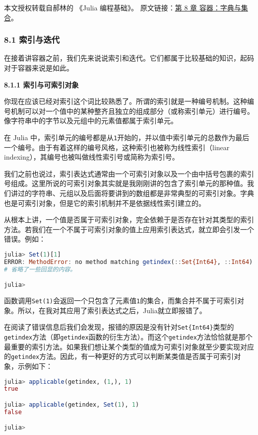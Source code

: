 
本文授权转载自郝林的 《Julia 编程基础》。 原文链接：\href{https://github.com/hyper0x/JuliaBasics/blob/master/book/ch08.md}{第 8 章 容器：字典与集合}。


\subsubsection{8.1 索引与迭代}

在接着讲容器之前，我们先来说说索引和迭代。它们都属于比较基础的知识，起码对于容器来说是如此。

\textbf{8.1.1 索引与可索引对象}

你现在应该已经对索引这个词比较熟悉了。所谓的索引就是一种编号机制。这种编号机制可以对一个值中的某种整齐且独立的组成部分（或称索引单元）进行编号。像字符串中的字节以及元组中的元素值都属于索引单元。

在 Julia 中，索引单元的编号都是从\verb`1`开始的，并以值中索引单元的总数作为最后一个编号。由于有着这样的编号风格，这种索引也被称为线性索引（linear indexing），其编号也被叫做线性索引号或简称为索引号。

我们之前也说过，索引表达式通常由一个可索引对象以及一个由中括号包裹的索引号组成。这里所说的可索引对象其实就是我刚刚讲的包含了索引单元的那种值。我们讲过的字符串、元组以及后面将要讲到的数组都是非常典型的可索引对象。字典也是可索引对象，但是它的索引机制并不是依据线性索引建立的。

从根本上讲，一个值是否属于可索引对象，完全依赖于是否存在针对其类型的索引方法。若我们在一个不属于可索引对象的值上应用索引表达式，就立即会引发一个错误。例如：
\begin{lstlisting}[language=julia]
julia> Set(1)[1]
ERROR: MethodError: no method matching getindex(::Set{Int64}, ::Int64)
# 省略了一些回显的内容。

julia> 
\end{lstlisting}

函数调用\verb`Set(1)`会返回一个只包含了元素值\verb`1`的集合，而集合并不属于可索引对象。所以，在我对其应用了索引表达式之后，Julia就立即报错了。

在阅读了错误信息后我们会发现，报错的原因是没有针对\verb`Set{Int64}`类型的\verb`getindex`方法（即\verb`getindex`函数的衍生方法）。而这个\verb`getindex`方法恰恰就是那个最重要的索引方法。如果我们想让某个类型的值成为可索引对象就至少要实现对应的\verb`getindex`方法。因此，有一种更好的方式可以判断某类值是否属于可索引对象，示例如下：
\begin{lstlisting}[language=julia]
julia> applicable(getindex, (1,), 1)
true

julia> applicable(getindex, Set(1), 1)
false

julia> 
\end{lstlisting}

